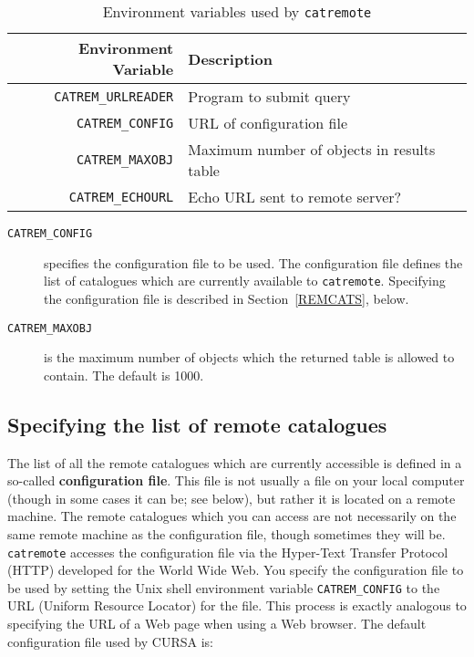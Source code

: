 \documentclass[twoside,11pt]{starlink}
\begin{document}
\begin{table}[htbp]

\begin{center}
\begin{tabular}{rl}
Environment Variable     & Description \\ \hline
\texttt{CATREM\_URLREADER} & Program to submit query \\
\texttt{CATREM\_CONFIG}    & URL of configuration file \\
\texttt{CATREM\_MAXOBJ}    & Maximum number of objects in results table \\
\texttt{CATREM\_ECHOURL}   & Echo URL sent to remote server? \\
\end{tabular}
\end{center}

\caption{Environment variables used by \texttt{catremote} \label{ENVARS} }

\end{table}

\begin{description}

  \item[\texttt{CATREM\_CONFIG}] specifies the configuration file to be used.
   The configuration file defines the list of catalogues which are
   currently available to \texttt{catremote}.  Specifying the configuration
   file is described in Section~\ref{REMCATS}, below.

  \item[\texttt{CATREM\_MAXOBJ}] is the maximum number of objects which the
   returned table is allowed to contain.  The default is 1000.

\end{description}

\subsection{Specifying the list of remote catalogues  \label{REMCATS} }

The list of all the remote catalogues which are currently accessible
is defined in a so-called \textbf{configuration file}.  This file is not
usually a file on your local computer (though in some cases it can be;
see below), but rather it is located on a remote machine.  The remote
catalogues which you can access are not necessarily on the same remote
machine as the configuration file, though sometimes they will be.  \texttt{catremote} accesses the configuration file via the Hyper-Text Transfer
Protocol (HTTP)  developed for the World Wide Web.  You specify the
configuration file to be used by setting the Unix shell environment
variable \texttt{CATREM\_CONFIG} to the URL (Uniform Resource Locator)
for the file.  This process is exactly analogous to specifying the URL
of a Web page when using a Web browser.  The default configuration file
used by CURSA is:
\end{document}
